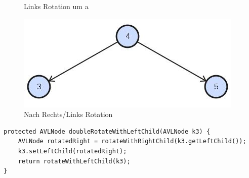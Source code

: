 \begin{figure}[h!]
\begin{minipage}[t]{0.4\textwidth}
		\caption{Links Rotation um a}
		\label{fig:searchtreeinsert2}
	\end{minipage}
	\begin{minipage}[t]{0.4\textwidth}
		\centering
		\includegraphics[width=0.9\linewidth]{images/avl_rotation_final}
		\caption{Nach Rechts/Links Rotation}
		\label{fig:searchtreeinsert2}
	\end{minipage}
\end{figure}
\begin{lstlisting}[caption=AVL Tree: Right/Left Rotation]
protected AVLNode doubleRotateWithLeftChild(AVLNode k3) {
	AVLNode rotatedRight = rotateWithRightChild(k3.getLeftChild());
	k3.setLeftChild(rotatedRight);
	return rotateWithLeftChild(k3);
}
\end{lstlisting}

\clearpage

